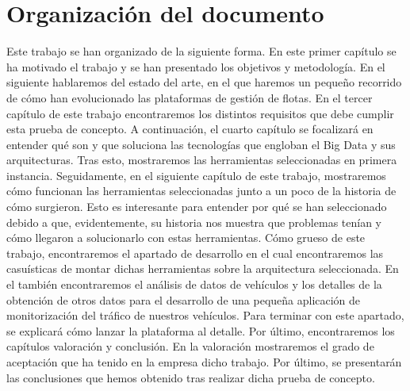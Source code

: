 \section{Organización del documento\label{organizacion}}

Este trabajo se han organizado de la siguiente forma. En este primer
capítulo se ha motivado el trabajo y se han presentado los objetivos
y metodología. En el siguiente hablaremos del estado del arte, en el
que haremos un pequeño recorrido de cómo han evolucionado las
plataformas de gestión de flotas. En el tercer capítulo de este trabajo
encontraremos los distintos requisitos que debe cumplir esta prueba de 
concepto. A continuación, el cuarto capítulo se focalizará en entender
qué son y que soluciona las tecnologías que engloban el Big Data y sus
arquitecturas. Tras esto, mostraremos las herramientas seleccionadas en
primera instancia. Seguidamente, en el siguiente capítulo de este trabajo, 
mostraremos cómo funcionan las herramientas seleccionadas
junto a un poco de la historia de cómo surgieron. Esto es interesante
para entender por qué se han seleccionado debido a que, evidentemente,
su historia nos muestra que problemas tenían y cómo llegaron a
solucionarlo con estas herramientas. Cómo grueso de este trabajo,
encontraremos el apartado de desarrollo
en el cual encontraremos las casuísticas de montar dichas herramientas
sobre la arquitectura seleccionada. En el también encontraremos el
análisis de datos de vehículos y los detalles de la obtención de otros
datos para el desarrollo de una pequeña aplicación de monitorización del
tráfico de nuestros vehículos. Para terminar con este apartado, se
explicará cómo lanzar la plataforma al detalle. Por último, encontraremos
los capítulos valoración y conclusión. En la valoración mostraremos el
grado de aceptación que ha tenido en la empresa dicho trabajo. Por último,
se presentarán las conclusiones que hemos obtenido tras realizar dicha
prueba de concepto.

